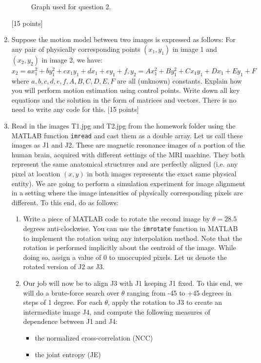 \documentclass[11pt]{article}
\begin{document}
\begin{enumerate}
\begin{figure}
\label{fig:graph1}
\caption{Graph used for question 2.}
\end{figure}
\textsf{[15 points]}


\item Suppose the motion model between two images is expressed as follows: For any pair of physically corresponding points $(x_1,y_1)$ in image 1 and $(x_2, y_2)$ in image 2, we have: $x_2 = ax^2_1 + by^2_1 + c x_1 y_1 + d x_1 + e y_1 + f, y_2 = Ax^2_1 + By^2_1 + C x_1 y_1 + D x_1 + E y_1 + F$ where $a,b,c,d,e,f,A,B,C,D,E,F$ are all (unknown) constants. Explain how you will perform motion estimation using control points. Write down all key equations and the solution in the form of matrices and vectors. There is no need to write any code for this.
\textsf{[15 points]}

\item Read in the images T1.jpg and T2.jpg from the homework folder using the MATLAB function \texttt{imread} and cast them as a double array. Let us call these images as J1 and J2. These are magnetic resonance images of a portion of the human brain, acquired with different settings of the MRI machine. They both represent the same anatomical structures and are perfectly aligned (i.e. any pixel at location $(x,y)$ in both images represents the exact same physical entity). We are going to perform a simulation experiment for image alignment in a setting where the image intensities of physically corresponding pixels are different. To this end, do as follows:
\begin{enumerate}
\item Write a piece of MATLAB code to rotate the second image by $\theta = 28.5$ degrees anti-clockwise. You can use the \texttt{imrotate} function in MATLAB to implement the rotation using any interpolation method. Note that the rotation is performed implicitly about the centroid of the image. While doing so, assign a value of 0 to unoccupied pixels. Let us denote the rotated version of J2 as J3. 
\item Our job will now be to align J3 with J1 keeping J1 fixed. To this end, we will do a brute-force search over $\theta$ ranging from -45 to +45 degrees in steps of 1 degree. For each $\theta$, apply the rotation to J3 to create an intermediate image J4, and compute the following measures of dependence between J1 and J4:
\begin{itemize}
\item the normalized cross-correlation (NCC)
\item the joint entropy (JE)

\end{itemize}
\end{enumerate}
\end{enumerate}
\end{document}

